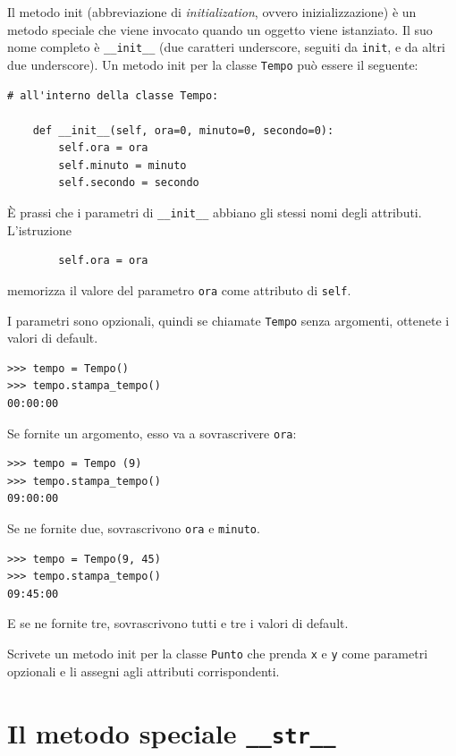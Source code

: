 \documentclass[10pt]{book}
\begin{document}
Il metodo init (abbreviazione di {\em initialization}, ovvero inizializzazione) è un metodo speciale che viene invocato quando un oggetto viene istanziato. Il suo nome completo è \verb"__init__" (due caratteri underscore, 
seguiti da {\tt init}, e da altri due  underscore). Un metodo init per la classe  {\tt Tempo} può essere il seguente:

\begin{verbatim}
# all'interno della classe Tempo:

    def __init__(self, ora=0, minuto=0, secondo=0):
        self.ora = ora
        self.minuto = minuto
        self.secondo = secondo
\end{verbatim}
%
È prassi che i parametri di \verb"__init__" abbiano gli stessi nomi degli attributi. L'istruzione

\begin{verbatim}
        self.ora = ora
\end{verbatim}
%
memorizza il valore del parametro {\tt ora} come attributo di {\tt self}.

I parametri sono opzionali, quindi se chiamate {\tt Tempo} senza argomenti, ottenete i valori di default.

\begin{verbatim}
>>> tempo = Tempo()
>>> tempo.stampa_tempo()
00:00:00
\end{verbatim}
%
Se fornite un argomento, esso va a sovrascrivere {\tt ora}:

\begin{verbatim}
>>> tempo = Tempo (9)
>>> tempo.stampa_tempo()
09:00:00
\end{verbatim}
%
Se ne fornite due, sovrascrivono {\tt ora} e {\tt minuto}.

\begin{verbatim}
>>> tempo = Tempo(9, 45)
>>> tempo.stampa_tempo()
09:45:00
\end{verbatim}
%
E se ne fornite tre, sovrascrivono tutti e tre i valori di default.

\vspace{0.2in}
\begin{exercise}

Scrivete un metodo init per la classe {\tt Punto} che prenda {\tt x} e {\tt y} come parametri opzionali e li assegni agli attributi corrispondenti.
\end{exercise}


\section{Il metodo speciale {\tt \_\_str\_\_}}
\end{document}
